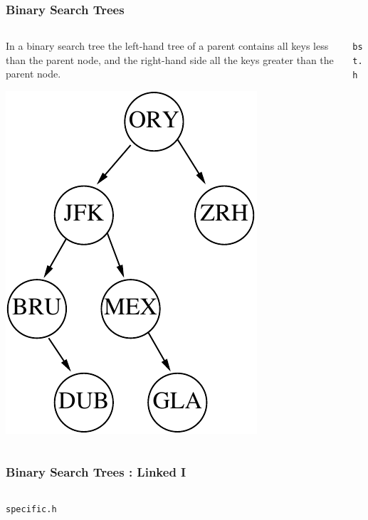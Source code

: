 \begin{frame}[fragile]
\frametitle{Binary Search Trees}
\begin{columns}[T]

\begin{column}{0.40\textwidth}
In a binary search tree the left-hand tree of a parent contains
all keys less than the parent node, and the right-hand side all
the keys greater than the parent node.	
\begin{center}	
\includegraphics[height=0.5\textheight]{../Images/treeapt.pdf}	
\end{center}	
\end{column}

\pause
\begin{column}{0.50\textwidth}
\verb^bst.h^

\end{column}

\end{columns}
\end{frame}


\begin{frame}[fragile]
\frametitle{Binary Search Trees : Linked I}
\begin{columns}[T]

\begin{column}{0.45\textwidth}
\verb^specific.h^

\end{column}

\begin{column}{0.45\textwidth}

\end{column}

\end{columns}
\end{frame}

